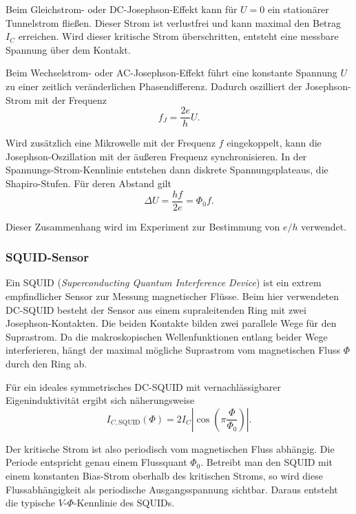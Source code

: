 \documentclass{article}
\begin{document}
Beim Gleichstrom- oder DC-Josephson-Effekt kann für $U=0$ ein stationärer Tunnelstrom fließen. Dieser Strom ist verlustfrei und kann maximal den Betrag $I_C$ erreichen. Wird dieser kritische Strom überschritten, entsteht eine messbare Spannung über dem Kontakt.

Beim Wechselstrom- oder AC-Josephson-Effekt führt eine konstante Spannung $U$ zu einer zeitlich veränderlichen Phasendifferenz. Dadurch oszilliert der Josephson-Strom mit der Frequenz
\begin{equation}
    f_J = \frac{2e}{h}U.
\end{equation}

Wird zusätzlich eine Mikrowelle mit der Frequenz $f$ eingekoppelt, kann die Josephson-Oszillation mit der äußeren Frequenz synchronisieren. In der Spannungs-Strom-Kennlinie entstehen dann diskrete Spannungsplateaus, die Shapiro-Stufen. Für deren Abstand gilt
\begin{equation}
    \Delta U = \frac{hf}{2e} = \Phi_0 f.
\end{equation}

Dieser Zusammenhang wird im Experiment zur Bestimmung von $e/h$ verwendet. \cite{fprak_manual} \cite{mr_squid}

\subsubsection{SQUID-Sensor}

Ein SQUID (\textit{Superconducting Quantum Interference Device}) ist ein extrem empfindlicher Sensor zur Messung magnetischer Flüsse. Beim hier verwendeten DC-SQUID besteht der Sensor aus einem supraleitenden Ring mit zwei Josephson-Kontakten. Die beiden Kontakte bilden zwei parallele Wege für den Suprastrom. Da die makroskopischen Wellenfunktionen entlang beider Wege interferieren, hängt der maximal mögliche Suprastrom vom magnetischen Fluss $\Phi$ durch den Ring ab.

Für ein ideales symmetrisches DC-SQUID mit vernachlässigbarer Eigeninduktivität ergibt sich näherungsweise
\begin{equation}
    I_{C,\mathrm{SQUID}}(\Phi)=2I_C\left|\cos\left(\pi\frac{\Phi}{\Phi_0}\right)\right|.
\end{equation}

Der kritische Strom ist also periodisch vom magnetischen Fluss abhängig. Die Periode entspricht genau einem Flussquant $\Phi_0$. Betreibt man den SQUID mit einem konstanten Bias-Strom oberhalb des kritischen Stroms, so wird diese Flussabhängigkeit als periodische Ausgangsspannung sichtbar. Daraus entsteht die typische $V$-$\Phi$-Kennlinie des SQUIDs.
\end{document}

